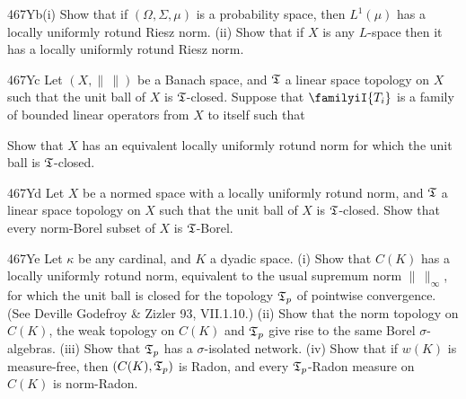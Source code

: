 {\spheader 467Yb(i) Show that if $(\Omega,\Sigma,\mu)$ is a probability
space, then $L^1(\mu)$ has a locally uniformly rotund Riesz norm.
(ii) Show that if $X$ is any $L$-space then it has a locally uniformly
rotund Riesz norm.   

\spheader 467Yc
Let $(X,\|\,\|)$ be a Banach space, and $\frak T$ a linear
space topology on $X$ such that the unit ball of $X$ is $\frak T$-closed.
Suppose that
$\familyiI{T_i}$ is a family of bounded linear operators from $X$ to itself
such that


\noindent  Show that
$X$ has an equivalent locally uniformly rotund norm for which the unit ball
is $\frak T$-closed.

\spheader 467Yd
Let $X$ be a normed space with a locally uniformly rotund
norm, and $\frak T$ a linear space
topology on $X$ such that the unit ball of $X$ is $\frak T$-closed.
Show that every norm-Borel subset of $X$ is $\frak T$-Borel.

\spheader 467Ye
Let $\kappa$ be any cardinal, and $K$ a dyadic space.   (i) Show that
$C(K)$ has a locally uniformly rotund norm, equivalent to
the usual supremum norm $\|\,\|_{\infty}$, for which the unit ball is
closed for the topology $\frak T_p$ of pointwise convergence.
(See {\smc Deville Godefroy \& Zizler 93}, VII.1.10.)
(ii) Show that the norm topology on $C(K)$, the weak topology on $C(K)$ and
$\frak T_p$ give rise to the same Borel $\sigma$-algebras.
(iii) Show that $\frak T_p$ has a $\sigma$-isolated network.   (iv) Show
that if
$w(K)$ is measure-free, then $(C(K),\frak T_p)$ is Radon, and every
$\frak T_p$-Radon measure on $C(K)$ is norm-Radon.

}%

